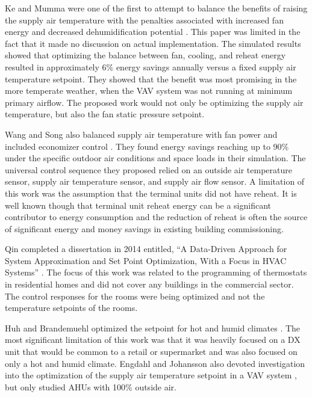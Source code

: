 Ke and Mumma were one of the first to attempt to balance the benefits of
raising the supply air temperature with the penalties associated with
increased fan energy and decreased dehumidification potential
\cite{Ke1997OptimizedSystems}. This paper was limited in the fact that
it made no discussion on actual implementation. The simulated results
showed that optimizing the balance between fan, cooling, and reheat
energy resulted in approximately 6\% energy savings annually versus a
fixed supply air temperature setpoint. They showed that the benefit was
most promising in the more temperate weather, when the VAV system was
not running at minimum primary airflow. The proposed work would not only
be optimizing the supply air temperature, but also the fan static pressure setpoint.   

Wang and Song also balanced supply air temperature with fan power and
included economizer control \cite{Wang2012AirCycles}. They found energy
savings reaching up to 90\% under the specific outdoor air conditions
and space loads in their simulation. The universal control sequence they
proposed relied on an outside air temperature sensor, supply air
temperature sensor, and supply air flow sensor. A limitation of this
work was the assumption that the terminal units did not have reheat. It
is well known though that terminal unit reheat energy can be a
significant contributor to energy consumption and the reduction of
reheat is often the source of significant energy and money savings in
existing building commissioning.  

Qin completed a dissertation in 2014 entitled, ``A Data-Driven Approach
for System Approximation and Set Point Optimization, With a Focus in
HVAC Systems'' \cite{Qin_2014_Res_Letters}. The focus of this work was
related to the programming of thermostats in residential homes and did
not cover any buildings in the commercial sector. The control responses
for the rooms were being optimized and not the temperature setpoints of
the rooms.  

Huh and Brandemuehl optimized the setpoint for hot and humid climates
\cite{Huh2008}. The most significant limitation of this work was that it
was heavily focused on a DX unit that would be common to a retail or
supermarket and was also focused on only a hot and humid climate.
Engdahl and Johansson also devoted investigation into the optimization
of the supply air temperature setpoint in a VAV system
\cite{Engdahl2004}, but only studied AHUs with 100\% outside air. 


